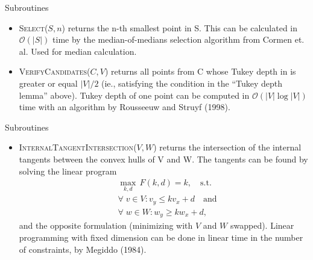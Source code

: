 \documentclass{beamer}
\newcommand{\order}[1]{\ensuremath{\mathcal{O}(#1)}}
\begin{document}
\begin{frame}{Subroutines}
  \begin{itemize}
  \item \textsc{Select}(\(S, n\)) returns the n-th smallest point in S. This can be calculated in
    \order{|S|} time by the median-of-medians selection algorithm from Cormen et. al. Used for
    median calculation.
  \item \textsc{VerifyCandidates}(\(C, V\)) returns all points from C whose Tukey depth in is
    greater or equal \(|V|/2\) (ie., satisfying the condition in the \enquote{Tukey depth lemma}
    above). Tukey depth of one point can be computed in \order{|V| \log |V|} time with an algorithm
    by Rousseeuw and Struyf (1998).
  \end{itemize}
\end{frame}


\begin{frame}{Subroutines}
  \begin{itemize}
  \item \textsc{InternalTangentIntersection}(\(V, W\)) returns the intersection of the internal
    tangents between the convex hulls of V and W. The tangents can be found by solving the linear
    program
    \begin{align*}
      &\max_{k, d}\, F(k, d) = k, \quad \text{s.t.}\\
      &\forall\; v \in V: v_y \leq k  v_x + d \quad \text{and} \\
      &\forall\; w \in W: w_y \geq k  w_x + d,
    \end{align*}
    and the opposite formulation (minimizing with \(V\) and \(W\) swapped). Linear programming with
    fixed dimension can be done in linear time in the number of constraints, by Megiddo (1984).
  \end{itemize}
\end{frame}
\end{document}
